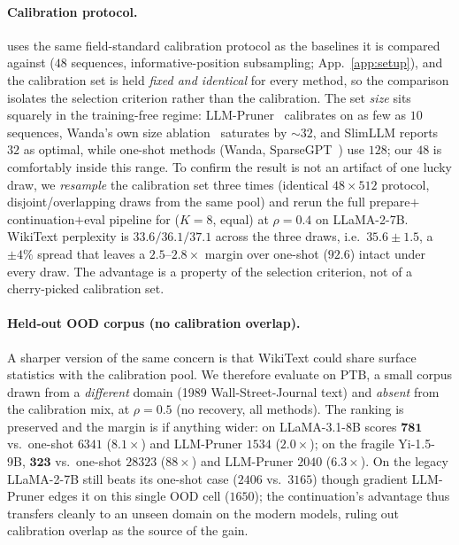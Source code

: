 \paragraph{Calibration protocol.} \method uses the same field-standard calibration protocol as the
baselines it is compared against ($48$ sequences, informative-position subsampling; App.~\ref{app:setup}),
and the calibration set is held \emph{fixed and identical} for every method, so the comparison isolates
the selection criterion rather than the calibration. The set \emph{size} sits squarely in the
training-free regime: LLM-Pruner~\citep{ma2023llmpruner} calibrates on as few as $10$ sequences, Wanda's
own size ablation~\citep{sun2024wanda} saturates by $\sim\!32$, and SlimLLM reports $32$ as optimal, while
one-shot methods (Wanda, SparseGPT~\citep{frantar2023sparsegpt}) use $128$; our $48$ is comfortably inside
this range. To confirm the result is not an artifact of one
lucky draw, we \emph{resample} the calibration set three times (identical $48{\times}512$ protocol,
disjoint/overlapping draws from the same pool) and rerun the full prepare$+$continuation$+$eval pipeline for
\method ($K{=}8$, equal) at $\rho{=}0.4$ on LLaMA-2-7B. WikiText perplexity is $33.6/36.1/37.1$ across
the three draws, i.e.\ $\mathbf{35.6\pm1.5}$, a $\pm4\%$ spread that leaves a $2.5$--$2.8\times$ margin over
one-shot ($92.6$) intact under every draw. The advantage is a property of the selection criterion, not of
a cherry-picked calibration set.

\paragraph{Held-out OOD corpus (no calibration overlap).} A sharper version of the same concern is that
WikiText could share surface statistics with the calibration pool. We therefore evaluate on PTB, a small
corpus drawn from a \emph{different} domain (1989 Wall-Street-Journal text) and \emph{absent} from the
calibration mix, at $\rho{=}0.5$ (no recovery, all methods). The ranking is preserved and the margin is
if anything wider: on LLaMA-3.1-8B \method scores $\mathbf{781}$ vs.\ one-shot $6341$ ($8.1\times$) and
LLM-Pruner $1534$ ($2.0\times$); on the fragile Yi-1.5-9B, $\mathbf{323}$ vs.\ one-shot $28323$
($88\times$) and LLM-Pruner $2040$ ($6.3\times$). On the legacy LLaMA-2-7B \method still beats its
one-shot case ($2406$ vs.\ $3165$) though gradient LLM-Pruner edges it on this single OOD cell ($1650$);
the continuation's advantage thus transfers cleanly to an unseen domain on the modern models, ruling out
calibration overlap as the source of the gain.

